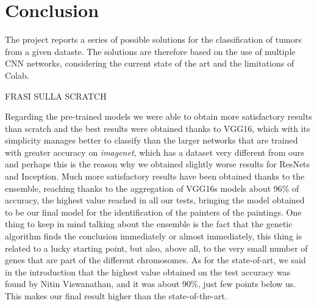 \section{Conclusion}
The project reports a series of possible solutions for the classification of tumors from a given dataste. The solutions are therefore based on the use of multiple CNN networks, considering the current state of the art and the limitations of Colab.

FRASI SULLA SCRATCH

Regarding the pre-trained models we were able to obtain more satisfactory results than scratch and the best results were obtained thanks to VGG16, which with its simplicity manages better to classify than the larger networks that are trained with greater accuracy on \textit{imagenet}, which has a dataset very different from ours and perhaps this is the reason why we obtained slightly worse results for ResNets and Inception. 
Much more satisfactory results have been obtained thanks to the ensemble, reaching thanks to the aggregation of VGG16s models about 96\% of accuracy, the highest value reached in all our tests, bringing the model obtained to be our final model for the identification of the painters of the paintings. One thing to keep in mind talking about the ensemble is the fact that the genetic algorithm finds the conclusion immediately or almost immediately, this thing is related to a lucky starting point, but also, above all, to the very small number of genes that are part of the different chromosomes.
As for the state-of-art, we said in the introduction that the highest value obtained on the test accuracy was found by Nitin Viswanathan, and it was about 90\%, just few points below us. This makes our final result higher than the state-of-the-art.